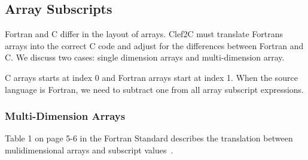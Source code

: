 \subsection{Array Subscripts}
\label{arraysubs}

Fortran and C differ in the layout of arrays.  Clef2C must translate
Fortrans arrays into the correct C code and adjust for the differences
between Fortran and C.  We discuss two cases: single dimension arrays
and multi-dimension array.

C arrays starts at index 0 and Fortran arrays start at index 1.  When
the source language is Fortran, we need to subtract one from all array
subscript expressions.

\subsubsection*{Multi-Dimension Arrays}

Table 1 on page 5-6 in the Fortran Standard describes the translation
between mulidimensional arrays and subscript values~\cite{f77}.

	

